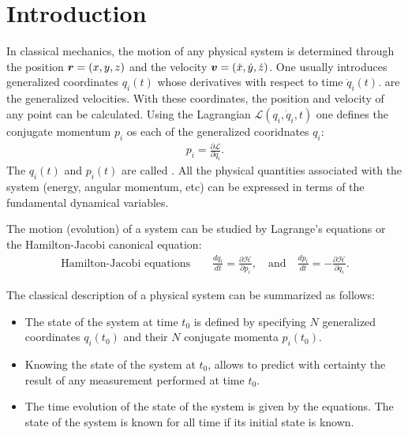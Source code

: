 \section{Introduction}

In classical mechanics, the motion of any physical system is determined through the position $\bm{r}=(x,y,z)$ and the velocity 
$\bm{v}=(\dot{x},\dot{y},\dot{z})$. One usually introduces generalized coordinates $q_i(t)$ whose derivatives with respect to time $\dot{q}_i(t)$.
are the generalized velocities. With these coordinates, the position and velocity of any point can be calculated.
Using the Lagrangian $\mathcal{L}(q_i,\dot{q}_i,t)$ one defines the conjugate momentum $p_i$ os each of the 
generalized cooridnates $q_i$:
\begin{align*}
    p_i=\frac{\partial\mathcal{L}}{\partial\dot{q}_i}.
\end{align*}
The $q_i(t)$ and $p_i(t)$ are called . All the physical quantities associated with the system
(energy, angular momentum, etc) can be expressed in terms of the fundamental dynamical variables. 

The motion (evolution) of a system can be studied by Lagrange's equations or the Hamilton-Jacobi canonical equation:
\begin{align*}
    \text{Hamilton-Jacobi equations}\qquad\frac{dq_i}{dt}=\frac{\partial\mathcal{H}}{\partial p_i},\quad\text{and}\quad\frac{dp_i}{dt}=-\frac{\partial\mathcal{H}}{\partial q_i}.
\end{align*}




The classical description of a physical system can be summarized as follows:
\begin{itemize}[itemsep=0pt,topsep=0pt]
    \item The state of the system at time $t_0$ is defined by specifying $N$ generalized coordinates $q_i(t_0)$ and their $N$ conjugate momenta $p_i(t_0)$.
    \item Knowing the state of the system at $t_0$, allows to predict with certainty the result of any measurement performed at time $t_0$. 
    \item The time evolution of the state of the system is given by the  equations. The state of the system is known for all time if its initial 
    state is known.
\end{itemize}


